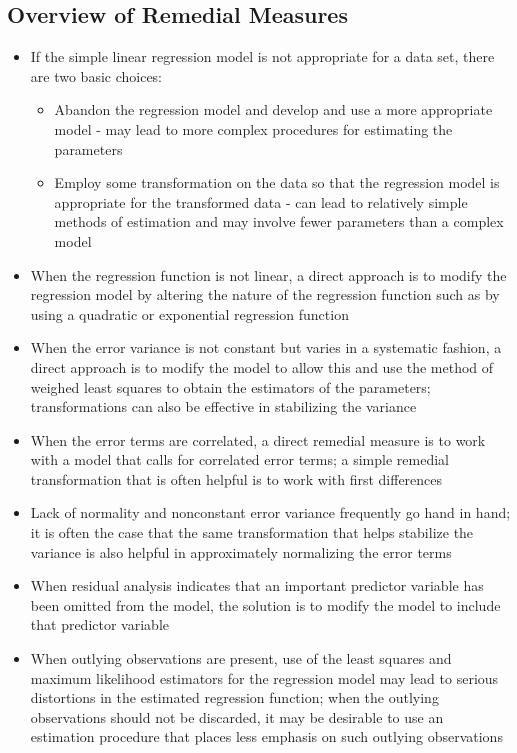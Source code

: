 \subsection{Overview of Remedial Measures}
\begin{itemize}
\item If the simple linear regression model is not appropriate for a data set, there are two basic choices: \begin{itemize} 
\item Abandon the regression model and develop and use a more appropriate model - may lead to more complex procedures for estimating the parameters 
\item Employ some transformation on the data so that the regression model is appropriate for the transformed data - can lead to relatively simple methods of estimation and may involve fewer parameters than a complex model \end{itemize} 
\item When the regression function is not linear, a direct approach is to modify the regression model by altering the nature of the regression function such as by using a quadratic or exponential regression function 
\item When the error variance is not constant but varies in a systematic fashion, a direct approach is to modify the model to allow this and use the method of weighed least squares to obtain the estimators of the parameters; transformations can also be effective in stabilizing the variance 
\item When the error terms are correlated, a direct remedial measure is to work with a model that calls for correlated error terms; a simple remedial transformation that is often helpful is to work with first differences 
\item Lack of normality and nonconstant error variance frequently go hand in hand; it is often the case that the same transformation that helps stabilize the variance is also helpful in approximately normalizing the error terms 
\item When residual analysis indicates that an important predictor variable has been omitted from the model, the solution is to modify the model to include that predictor variable 
\item When outlying observations are present, use of the least squares and maximum likelihood estimators for the regression model may lead to serious distortions in the estimated regression function; when the outlying observations should not be discarded, it may be desirable to use an estimation procedure that places less emphasis on such outlying observations
\end{itemize}  

